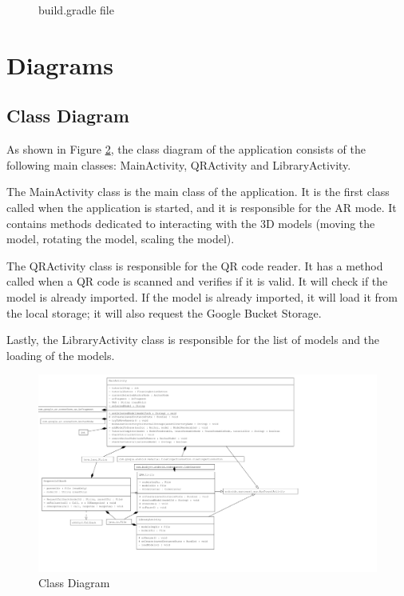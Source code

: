 \begin{figure}[ht]
\begin{minipage}{0.5\textwidth}
\begin{center}
            \caption{build.gradle file}
            \label{fig:Dependencies}
        \end{center}
    \end{minipage}
\end{figure}




\clearpage

\section{Diagrams}
\subsection*{Class Diagram}
As shown in Figure \ref{fig:ClassDiagram}, the class diagram of the application consists of the following main classes: MainActivity, QRActivity and LibraryActivity.

The MainActivity class is the main class of the application. It is the first class called when the application is started, and it is responsible for the \ac{AR} mode. It contains methods dedicated to interacting with the \ac{3D} models (moving the model, rotating the model, scaling the model).

The QRActivity class is responsible for the \ac{QR} code reader. It has a method called when a \ac{QR} code is scanned and verifies if it is valid. It will check if the model is already imported. If the model is already imported, it will load it from the local storage; it will also request the Google Bucket Storage.

Lastly, the LibraryActivity class is responsible for the list of models and the loading of the models.
\begin{figure}[ht]
    \centering
    \includegraphics[height=0.9\textwidth]{img/ClassDiagram.png}
    \caption{Class Diagram}
    \label{fig:ClassDiagram}
\end{figure}


